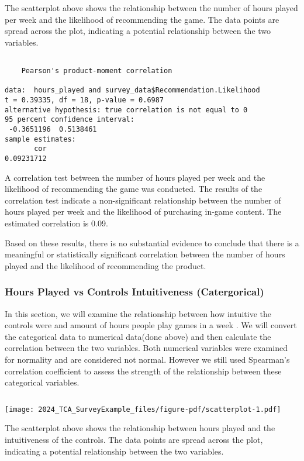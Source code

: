 \documentclass[
  letterpaper,
  DIV=11,
  numbers=noendperiod]{scrartcl}
\begin{document}
The scatterplot above shows the relationship between the number of hours
played per week and the likelihood of recommending the game. The data
points are spread across the plot, indicating a potential relationship
between the two variables.

\begin{verbatim}

    Pearson's product-moment correlation

data:  hours_played and survey_data$Recommendation.Likelihood
t = 0.39335, df = 18, p-value = 0.6987
alternative hypothesis: true correlation is not equal to 0
95 percent confidence interval:
 -0.3651196  0.5138461
sample estimates:
       cor 
0.09231712 
\end{verbatim}

A correlation test between the number of hours played per week and the
likelihood of recommending the game was conducted. The results of the
correlation test indicate a non-significant relationship between the
number of hours played per week and the likelihood of purchasing in-game
content. The estimated correlation is 0.09.

Based on these results, there is no substantial evidence to conclude
that there is a meaningful or statistically significant correlation
between the number of hours played and the likelihood of recommending
the product.

\subsubsection{Hours Played vs Controls Intuitiveness
(Catergorical)}\label{hours-played-vs-controls-intuitiveness-catergorical}

In this section, we will examine the relationship between how intuitive
the controls were and amount of hours people play games in a week . We
will convert the categorical data to numerical data(done above) and then
calculate the correlation between the two variables. Both numerical
variables were examined for normality and are considered not normal.
However we still used Spearman's correlation coefficient to assess the
strength of the relationship between these categorical variables.

\begin{verbatim}
\end{verbatim}

\texttt{[image: 2024\_TCA\_SurveyExample\_files/figure-pdf/scatterplot-1.pdf]}

The scatterplot above shows the relationship between hours played and
the intuitiveness of the controls. The data points are spread across the
plot, indicating a potential relationship between the two variables.
\end{document}
